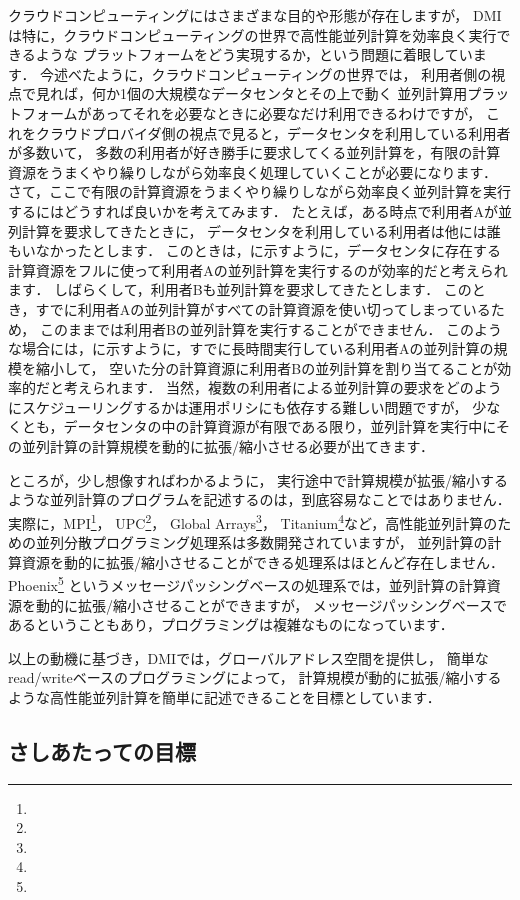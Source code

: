 \documentclass[report,12pt]{jsbook}
\begin{document}
クラウドコンピューティングにはさまざまな目的や形態が存在しますが，
DMIは特に，クラウドコンピューティングの世界で高性能並列計算を効率良く実行できるような
プラットフォームをどう実現するか，という問題に着眼しています．
今述べたように，クラウドコンピューティングの世界では，
利用者側の視点で見れば，何か1個の大規模なデータセンタとその上で動く
並列計算用プラットフォームがあってそれを必要なときに必要なだけ利用できるわけですが，
これをクラウドプロバイダ側の視点で見ると，データセンタを利用している利用者が多数いて，
多数の利用者が好き勝手に要求してくる並列計算を，有限の計算資源をうまくやり繰りしながら効率良く処理していくことが必要になります．
さて，ここで有限の計算資源をうまくやり繰りしながら効率良く並列計算を実行するにはどうすれば良いかを考えてみます．
たとえば，ある時点で利用者Aが並列計算を要求してきたときに，
データセンタを利用している利用者は他には誰もいなかったとします．
このときは，に示すように，データセンタに存在する計算資源をフルに使って利用者Aの並列計算を実行するのが効率的だと考えられます．
しばらくして，利用者Bも並列計算を要求してきたとします．
このとき，すでに利用者Aの並列計算がすべての計算資源を使い切ってしまっているため，
このままでは利用者Bの並列計算を実行することができません．
このような場合には，に示すように，すでに長時間実行している利用者Aの並列計算の規模を縮小して，
空いた分の計算資源に利用者Bの並列計算を割り当てることが効率的だと考えられます．
当然，複数の利用者による並列計算の要求をどのようにスケジューリングするかは運用ポリシにも依存する難しい問題ですが，
少なくとも，データセンタの中の計算資源が有限である限り，並列計算を実行中にその並列計算の計算規模を動的に拡張/縮小させる必要が出てきます．

ところが，少し想像すればわかるように，
実行途中で計算規模が拡張/縮小するような並列計算のプログラムを記述するのは，到底容易なことではありません．
実際に，MPI\footnote{}，
UPC\footnote{}，
Global Arrays\footnote{}，
Titanium\footnote{}など，高性能並列計算のための並列分散プログラミング処理系は多数開発されていますが，
並列計算の計算資源を動的に拡張/縮小させることができる処理系はほとんど存在しません．
Phoenix\footnote{}
というメッセージパッシングベースの処理系では，並列計算の計算資源を動的に拡張/縮小させることができますが，
メッセージパッシングベースであるということもあり，プログラミングは複雑なものになっています．

以上の動機に基づき，DMIでは，グローバルアドレス空間を提供し，
簡単なread/writeベースのプログラミングによって，
計算規模が動的に拡張/縮小するような高性能並列計算を簡単に記述できることを目標としています．

\subsection{さしあたっての目標}
\end{document}
